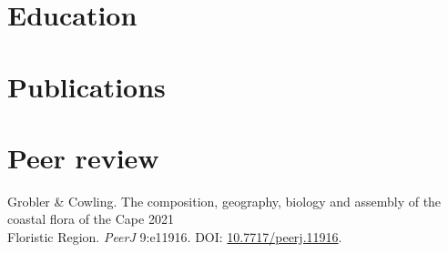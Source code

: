 \documentclass[10pt]{article}
\begin{document}


\section*{Education} %



\section*{Publications} %



\section*{Peer review} %

Grobler \& Cowling. The composition, geography, biology and assembly of the
  coastal flora of the Cape                                       \hfill 2021 \\
  \hspace{2em} Floristic Region. \textit{PeerJ} 9:e11916. DOI:
    \href{https://doi.org/10.7717/peerj.11916}{10.7717/peerj.11916}.

\hfill
\end{document}
